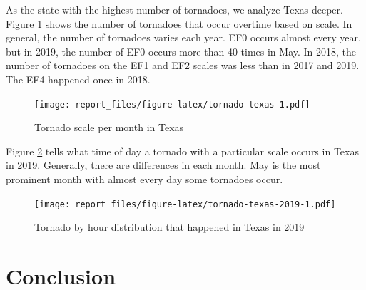 \documentclass[
]{article}
\begin{document}
As the state with the highest number of tornadoes, we analyze Texas deeper. Figure \ref{fig:tornado-texas} shows the number of tornadoes that occur overtime based on scale. In general, the number of tornadoes varies each year. EF0 occurs almost every year, but in 2019, the number of EF0 occurs more than 40 times in May. In 2018, the number of tornadoes on the EF1 and EF2 scales was less than in 2017 and 2019. The EF4 happened once in 2018.

\begin{figure}
\centering
\texttt{[image: report\_files/figure-latex/tornado-texas-1.pdf]}
\caption{\label{fig:tornado-texas}Tornado scale per month in Texas}
\end{figure}

Figure \ref{fig:tornado-texas-2019} tells what time of day a tornado with a particular scale occurs in Texas in 2019. Generally, there are differences in each month. May is the most prominent month with almost every day some tornadoes occur.

\begin{figure}
\centering
\texttt{[image: report\_files/figure-latex/tornado-texas-2019-1.pdf]}
\caption{\label{fig:tornado-texas-2019}Tornado by hour distribution that happened in Texas in 2019}
\end{figure}

\clearpage

\hypertarget{conclusion}{%
\section{Conclusion}\label{conclusion}}
\end{document}
